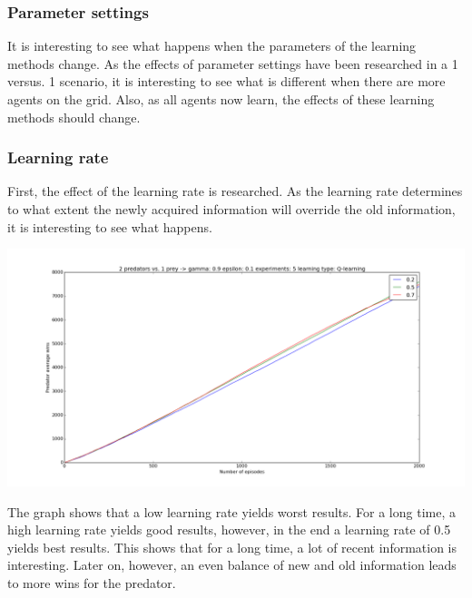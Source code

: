 \subsubsection{Parameter settings}
It is interesting to see what happens when the parameters of the learning methods change. As the effects of parameter settings have been researched in a 1 versus. 1 scenario, it is interesting to see what is different when there are more agents on the grid. Also, as all agents now learn, the effects of these learning methods should change.

\subsubsection{Learning rate}
First, the effect of the learning rate is researched. As the learning rate determines to what extent the newly acquired information will override the old information, it is interesting to see what happens.

\begin{center}
	\includegraphics[scale=0.3]{2_predators_learning_rate_q_learning}
\end{center}

The graph shows that a low learning rate yields worst results. For a long time, a high learning rate yields good results, however, in the end a learning rate of 0.5 yields best results. This shows that for a long time, a lot of recent information is interesting.  Later on, however, an even balance of new and old information leads to more wins for the predator. 

